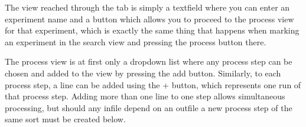 The view reached through the tab is simply a textfield where you can enter an
experiment name and a button which allows you to proceed to the process view
for that experiment, which is exactly the same thing that happens when marking
an experiment in the search view and pressing the process button there.

The process view is at first only a dropdown list where any process step can
be chosen and added to the view by pressing the add button. Similarly, to each 
process step, a line can be added using the + button, which represents one run
of that process step. Adding more than one line to one step allows simultaneous
processing, but should any infile depend on an outfile a new process step of the
same sort must be created below.